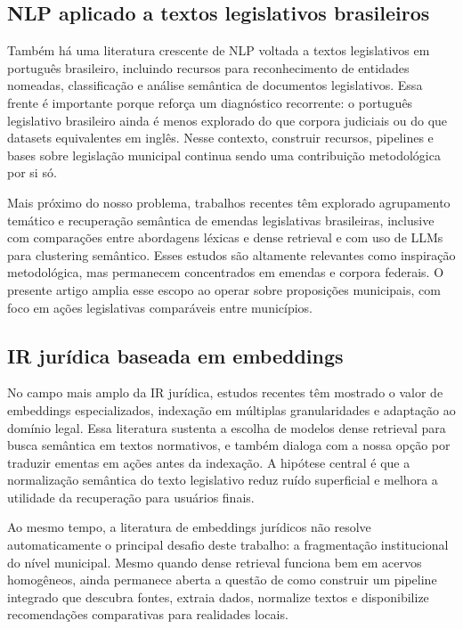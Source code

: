 \subsection{NLP aplicado a textos legislativos brasileiros}

Também há uma literatura crescente de NLP voltada a textos legislativos em português brasileiro, incluindo recursos para reconhecimento de entidades nomeadas, classificação e análise semântica de documentos legislativos. Essa frente é importante porque reforça um diagnóstico recorrente: o português legislativo brasileiro ainda é menos explorado do que corpora judiciais ou do que datasets equivalentes em inglês. Nesse contexto, construir recursos, pipelines e bases sobre legislação municipal continua sendo uma contribuição metodológica por si só.

Mais próximo do nosso problema, trabalhos recentes têm explorado agrupamento temático e recuperação semântica de emendas legislativas brasileiras, inclusive com comparações entre abordagens léxicas e dense retrieval e com uso de LLMs para clustering semântico. Esses estudos são altamente relevantes como inspiração metodológica, mas permanecem concentrados em emendas e corpora federais. O presente artigo amplia esse escopo ao operar sobre proposições municipais, com foco em ações legislativas comparáveis entre municípios.

\subsection{IR jurídica baseada em embeddings}

No campo mais amplo da IR jurídica, estudos recentes têm mostrado o valor de embeddings especializados, indexação em múltiplas granularidades e adaptação ao domínio legal. Essa literatura sustenta a escolha de modelos dense retrieval para busca semântica em textos normativos, e também dialoga com a nossa opção por traduzir ementas em ações antes da indexação. A hipótese central é que a normalização semântica do texto legislativo reduz ruído superficial e melhora a utilidade da recuperação para usuários finais.

Ao mesmo tempo, a literatura de embeddings jurídicos não resolve automaticamente o principal desafio deste trabalho: a fragmentação institucional do nível municipal. Mesmo quando dense retrieval funciona bem em acervos homogêneos, ainda permanece aberta a questão de como construir um pipeline integrado que descubra fontes, extraia dados, normalize textos e disponibilize recomendações comparativas para realidades locais.

